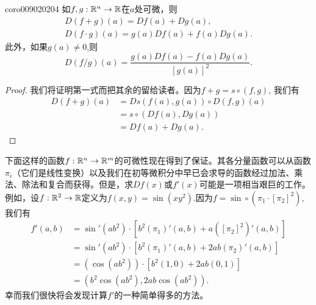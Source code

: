 \begin{corollary}{}{coro009020204}
如$f,g:\mathbb{R}^n \to \mathbb{R}$在$a$处可微，则
\begin{gather*}
D(f+g)(a) = Df(a) + Dg(a),\\
D(f \cdot g)(a) = g(a)Df(a) + f(a)Dg(a).
\end{gather*}
此外，如果$g(a) \neq 0$,则
\[
D(f/g)(a) = \frac{g(a)Df(a) - f(a)Dg(a)}{[g(a)]^2}.
\]
\end{corollary}

\begin{proof}
我们将证明第一式而把其余的留给读者。因为$f + g = s \circ (f, g)$, 我们有
\[
\begin{aligned}
D(f+g)(a) &= Ds(f(a), g(a)) \circ D(f, g)(a)\\
&= s \circ (Df(a), Dg(a))\\
&= Df(a) + Dg(a).
\end{aligned}
\]
\end{proof}

下面这样的函数$f: \mathbb{R}^n \to \mathbb{R}^m$的可微性现在得到了保证。其各分量函数可以从函数$\pi_i$（它们是线性变换）以及我们在初等微积分中早已会求导的函数经过加法、乘法、除法和复合而获得。但是，求$Df(x)$或$f'(x)$可能是一项相当艰巨的工作。例如，设$f:\mathbb{R}^2 \to \mathbb{R}$定义为$f(x, y) = \sin(xy^2)$.因为$f = \sin\circ(\pi_1 \cdot [\pi_2]^2)$,我们有
\[
\begin{aligned}
f'(a, b) &= \sin'(ab^2) \cdot [b^2(\pi_1)'(a, b) + a([\pi_2]^2)'(a, b)]\\
&= \sin'(ab^2) \cdot [b^2(\pi_1)'(a, b) + 2ab(\pi_2)'(a, b)]\\
&=(\cos(ab^2)) \cdot [b^2(1, 0) + 2ab(0, 1)]\\
&= (b^2\cos(ab^2), 2ab\cos(ab^2)).
\end{aligned}
\]
幸而我们很快将会发现计算$f'$的一种简单得多的方法。

